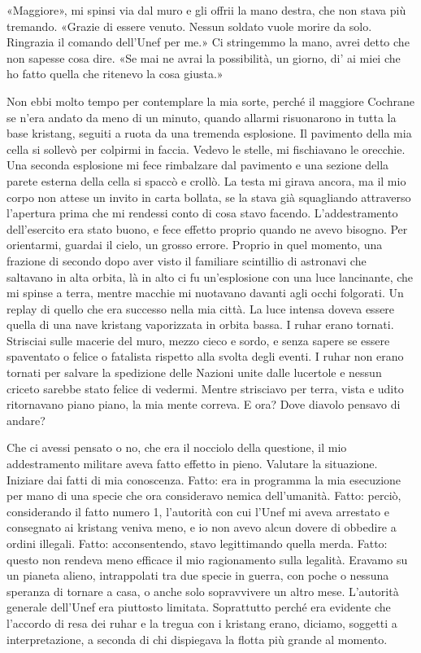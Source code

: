 «Maggiore», mi spinsi via dal muro e gli offrii la mano destra, che non
stava più tremando. «Grazie di essere venuto. Nessun soldato vuole
morire da solo. Ringrazia il comando dell'Unef per me.» Ci stringemmo la
mano, avrei detto che non sapesse cosa dire. «Se mai ne avrai la
possibilità, un giorno, di' ai miei che ho fatto quella che ritenevo la
cosa giusta.»

\hfill\break

Non ebbi molto tempo per contemplare la mia sorte, perché il maggiore
Cochrane se n'era andato da meno di un minuto, quando allarmi
risuonarono in tutta la base kristang, seguiti a ruota da una tremenda
esplosione. Il pavimento della mia cella si sollevò per colpirmi in
faccia. Vedevo le stelle, mi fischiavano le orecchie. Una seconda
esplosione mi fece rimbalzare dal pavimento e una sezione della parete
esterna della cella si spaccò e crollò. La testa mi girava ancora, ma il
mio corpo non attese un invito in carta bollata, se la stava già
squagliando attraverso l'apertura prima che mi rendessi conto di cosa
stavo facendo. L'addestramento dell'esercito era stato buono, e fece
effetto proprio quando ne avevo bisogno. Per orientarmi, guardai il
cielo, un grosso errore. Proprio in quel momento, una frazione di
secondo dopo aver visto il familiare scintillio di astronavi che
saltavano in alta orbita, là in alto ci fu un'esplosione con una luce
lancinante, che mi spinse a terra, mentre macchie mi nuotavano davanti
agli occhi folgorati. Un replay di quello che era successo nella mia
città. La luce intensa doveva essere quella di una nave kristang
vaporizzata in orbita bassa. I ruhar erano tornati. Strisciai sulle
macerie del muro, mezzo cieco e sordo, e senza sapere se essere
spaventato o felice o fatalista rispetto alla svolta degli eventi. I
ruhar non erano tornati per salvare la spedizione delle Nazioni unite
dalle lucertole e nessun criceto sarebbe stato felice di vedermi. Mentre
strisciavo per terra, vista e udito ritornavano piano piano, la mia
mente correva. E ora? Dove diavolo pensavo di andare?

Che ci avessi pensato o no, che era il nocciolo della questione, il mio
addestramento militare aveva fatto effetto in pieno. Valutare la
situazione. Iniziare dai fatti di mia conoscenza. Fatto: era in
programma la mia esecuzione per mano di una specie che ora consideravo
nemica dell'umanità. Fatto: perciò, considerando il fatto numero 1,
l'autorità con cui l'Unef mi aveva arrestato e consegnato ai kristang
veniva meno, e io non avevo alcun dovere di obbedire a ordini illegali.
Fatto: acconsentendo, stavo legittimando quella merda. Fatto: questo non
rendeva meno efficace il mio ragionamento sulla legalità. Eravamo su un
pianeta alieno, intrappolati tra due specie in guerra, con poche o
nessuna speranza di tornare a casa, o anche solo sopravvivere un altro
mese. L'autorità generale dell'Unef era piuttosto limitata. Soprattutto
perché era evidente che l'accordo di resa dei ruhar e la tregua con i
kristang erano, diciamo, soggetti a interpretazione, a seconda di chi
dispiegava la flotta più grande al momento.

